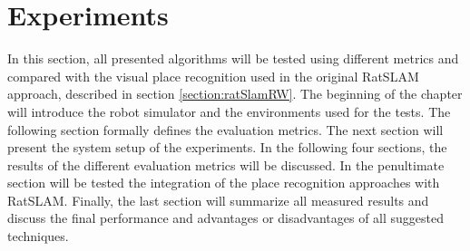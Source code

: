 \chapter{Experiments}\label{chapter:experiments}

In this section, all presented algorithms will be tested using different metrics and compared with the visual place recognition used in the original RatSLAM approach, described in section \ref{section:ratSlamRW}. The beginning of the chapter will introduce the robot simulator and the environments used for the tests. The following section formally defines the evaluation metrics. The next section will present the system setup of the experiments. In the following four sections, the results of the different evaluation metrics will be discussed. In the penultimate section will be tested the integration of the place recognition approaches with RatSLAM. Finally, the last section will summarize all measured results and discuss the final performance and advantages or disadvantages of all suggested techniques.










